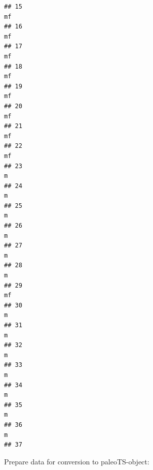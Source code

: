 \documentclass[]{article}
\begin{document}
\begin{verbatim}
## 15                                                                                                       mf
## 16                                                                                                       mf
## 17                                                                                                       mf
## 18                                                                                                       mf
## 19                                                                                                       mf
## 20                                                                                                       mf
## 21                                                                                                       mf
## 22                                                                                                       mf
## 23                                                                                                        m
## 24                                                                                                        m
## 25                                                                                                        m
## 26                                                                                                        m
## 27                                                                                                        m
## 28                                                                                                        m
## 29                                                                                                       mf
## 30                                                                                                        m
## 31                                                                                                        m
## 32                                                                                                        m
## 33                                                                                                        m
## 34                                                                                                        m
## 35                                                                                                        m
## 36                                                                                                        m
## 37
\end{verbatim}

Prepare data for conversion to paleoTS-object:
\end{document}
